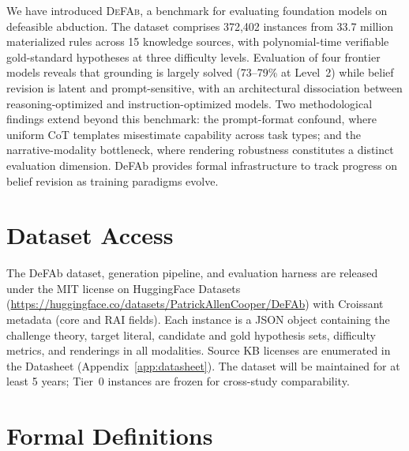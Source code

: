 \documentclass{article}
\theoremstyle{definition}
\begin{document}
We have introduced \textsc{DeFAb}, a benchmark for evaluating foundation models on defeasible abduction. The dataset comprises 372,402 instances from 33.7 million materialized rules across 15 knowledge sources, with polynomial-time verifiable gold-standard hypotheses at three difficulty levels. Evaluation of four frontier models reveals that grounding is largely solved (73--79\% at Level~2) while belief revision is latent and prompt-sensitive, with an architectural dissociation between reasoning-optimized and instruction-optimized models. Two methodological findings extend beyond this benchmark: the prompt-format confound, where uniform CoT templates misestimate capability across task types; and the narrative-modality bottleneck, where rendering robustness constitutes a distinct evaluation dimension. DeFAb provides formal infrastructure to track progress on belief revision as training paradigms evolve.


\section{Dataset Access}\label{sec:access}

The DeFAb dataset, generation pipeline, and evaluation harness are released under the MIT license on HuggingFace Datasets (\url{https://huggingface.co/datasets/PatrickAllenCooper/DeFAb}) with Croissant metadata (core and RAI fields). Each instance is a JSON object containing the challenge theory, target literal, candidate and gold hypothesis sets, difficulty metrics, and renderings in all modalities. Source KB licenses are enumerated in the Datasheet (Appendix~\ref{app:datasheet}). The dataset will be maintained for at least 5 years; Tier~0 instances are frozen for cross-study comparability.









\appendix


\section{Formal Definitions}\label{app:definitions}
\end{document}

